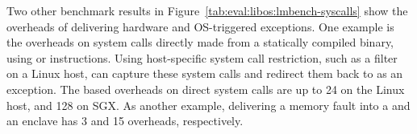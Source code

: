 Two other benchmark results in Figure~\ref{tab:eval:libos:lmbench-syscalls}
show the overheads
of delivering hardware and OS-triggered exceptions.
One example
is the overheads on system calls directly made from a statically compiled binary,
using  or  instructions.
Using host-specific system call restriction,
such as a \seccomp{} filter
on a Linux host,
\graphene{} can capture these system calls %
and redirect them back to \thelibos{} as an exception. %
The based overheads on direct system calls
are up to 24\x{} on the Linux host, and 128\x{} on SGX.
As another example,
delivering a memory fault
into a \picoproc{} and an enclave has 3\x{} and 15\x{} overheads, respectively.
















